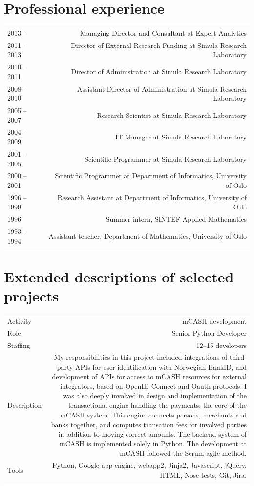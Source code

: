 \documentclass[english,a4paper,11pt]{article}
\begin{document}
\section*{Professional experience}

\begin{tabular}{LR}
2013 --  & Managing Director and Consultant at Expert Analytics\\ 
2011 -- 2013 & Director of External Research Funding at Simula Research Laboratory\\ 
2010 -- 2011 & Director of Administration at Simula Research Laboratory\\ 
2008 -- 2010 & Assistant Director of Administration at Simula Research Laboratory\\ 
2005 -- 2007 & Research Scientist at Simula Research Laboratory\\ 
2004 -- 2009 & IT Manager at Simula Research Laboratory\\ 
2001 -- 2005 & Scientific Programmer at Simula Research Laboratory\\ 
2000 -- 2001 & Scientific Programmer at Department of Informatics, University of Oslo\\ 
1996 -- 1999 & Research Assistant at Department of Informatics, University of Oslo\\ 
1996 & Summer intern, SINTEF Applied Mathematics\\ 
1993 -- 1994 & Assistant teacher, Department of Mathematics, University of Oslo\\ 
\end{tabular}

\section*{Extended descriptions of selected projects}

 \begin{tabular}{@{}LR}
Activity & mCASH development \\ 
Role & Senior Python Developer \\ 
Staffing & 12--15 developers \\ 
Description & My responsibilities in this project included integrations of third-party APIs for user-identification with Norwegian BankID, and development of APIs for access to mCASH resources for external integrators, based on OpenID Connect and Oauth protocols. I was also deeply involved in design and implementation of the transactional engine handling the payments; the core of the mCASH system. This engine connects persons, merchants and banks together, and computes transation fees for involved parties in addition to moving correct amounts. The backend system of mCASH is implemented solely in Python. The development at mCASH followed the Scrum agile method. \\ 
Tools & Python, Google app engine, webapp2, Jinja2, Javascript, jQuery, HTML, Nose tests, Git, Jira. \\ 
\end{tabular}
\end{document}
